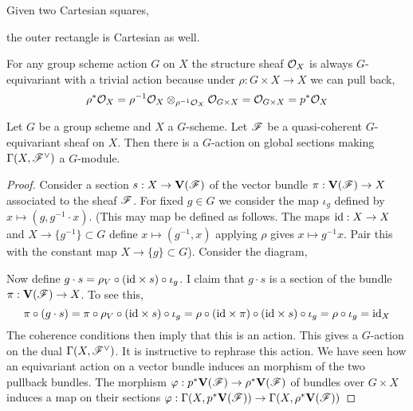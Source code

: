 \documentclass[12pt]{article}
\begin{document}
\begin{lemma}[Pullback]
Given two Cartesian squares,
\begin{center}
\end{center} 
the outer rectangle is Cartesian as well.
\end{lemma}

\begin{example}
For any group scheme action $G$ on $X$ the structure sheaf $\mathcal{O}_{X}$ is always $G$-equivariant with a trivial action because under $\rho : G \times X \to X$ we can pull back,
\[ \rho^* \mathcal{O}_{X} = \rho^{-1} \mathcal{O}_{X} \otimes_{\rho^{-1} \mathcal{O}_{X}} \mathcal{O}_{G \times X} = \mathcal{O}_{G \times X} = p^* \mathcal{O}_{X} \]
\end{example}

\begin{theorem}
Let $G$ be a group scheme and $X$ a $G$-scheme. Let $\mathscr{F}$ be a quasi-coherent $G$-equivariant sheaf on $X$. Then there is a $G$-action on global sections making $\Gamma(X, \mathscr{F}^\vee)$ a $G$-module.
\end{theorem}

\begin{proof}
Consider a section $s : X \to \mathbf{V}(\mathscr{F})$ of the vector bundle $\pi : \mathbf{V}(\mathscr{F}) \to X$ associated to the sheaf $\mathscr{F}$. For fixed $g \in G$ we consider the map $\iota_g$ defined by $x \mapsto (g, g^{-1} \cdot x)$. (This may map be defined as follows. The maps $\mathrm{id} : X \to X$ and $X \to \{ g^{-1} \} \subset G$ define $x \mapsto (g^{-1}, x)$ applying $\rho$ gives $x \mapsto g^{-1} x$. Pair this with the constant map $X \to \{ g \} \subset G$). Consider the diagram,
\begin{center}
\end{center}
Now define $g \cdot s = \rho_V \circ (\mathrm{id} \times s) \circ \iota_g$. I claim that $g \cdot s$ is a section of the bundle $\pi : \mathbf{V}(\mathscr{F}) \to X$. To see this, 
\[ \pi \circ (g \cdot s) = \pi \circ \rho_V \circ (\mathrm{id} \times s) \circ \iota_g = \rho \circ (\mathrm{id} \times \pi) \circ (\mathrm{id} \times s) \circ \iota_g = \rho \circ \iota_g = \mathrm{id}_X \]
The coherence conditions then imply that this is an action. This gives a $G$-action on the dual $\Gamma(X, \mathscr{F}^\vee)$. It is instructive to rephrase this action. We have seen how an equivariant action on a vector bundle induces an morphism of the two pullback bundles. The morphism $\varphi : p^* \mathbf{V}(\mathscr{F}) \to \rho^* \mathbf{V}(\mathscr{F})$ of bundles over $G \times X$ induces a map on their sections $\varphi : \Gamma(X,  p^*\mathbf{V}(\mathscr{F})) \to \Gamma(X, \rho^* \mathbf{V}(\mathscr{F}))$ 
\end{proof}
\end{document}

